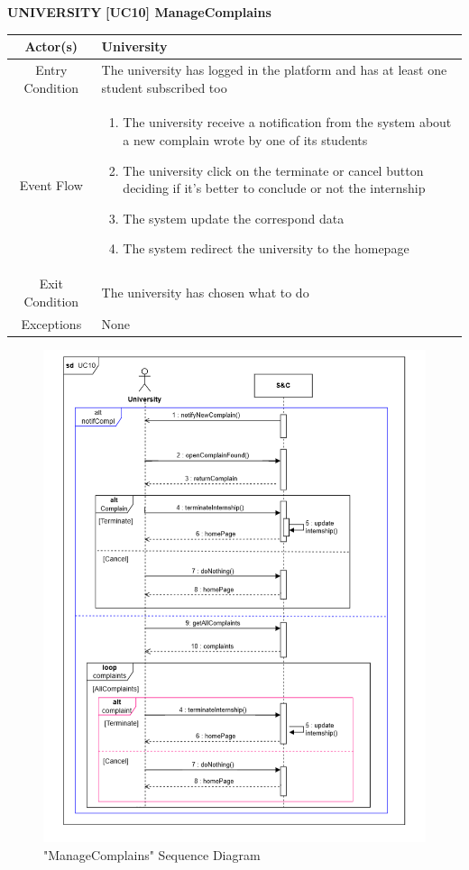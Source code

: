 \documentclass{article}
\begin{document}
\textbf{UNIVERSITY}\newline\newline
\vspace{1cm}
\textbf{[UC10] ManageComplains}

\begin{table}[H]
    \centering
    \begin{tabular}{|c|p{10cm}|}
    \hline
        Actor(s)  & University\\ 
    \hline
        Entry Condition &  
        The university has logged in the platform and has at least one student
        subscribed too\\
    \hline
        Event Flow &
        \begin{enumerate}
            \item The university receive a notification from the system about a new complain wrote by one of its students
            \item The university click on the terminate or cancel button deciding if it's better to conclude or not the internship
            \item The system update the correspond data
            \item The system redirect the university to the homepage
        \end{enumerate}
        \\
    \hline
        Exit Condition & The university has chosen what to do\\
    \hline
        Exceptions &  None\\
    \hline
    \end{tabular}
    \label{tab:my_label}
\end{table}
\begin{figure}[H]
    \centering
        \includegraphics[width=0.8\linewidth]{sequenceDiagrams/UC10.png}
    \caption{"ManageComplains" Sequence Diagram}
    \label{fig:enter-label}
\end{figure}
\end{document}
